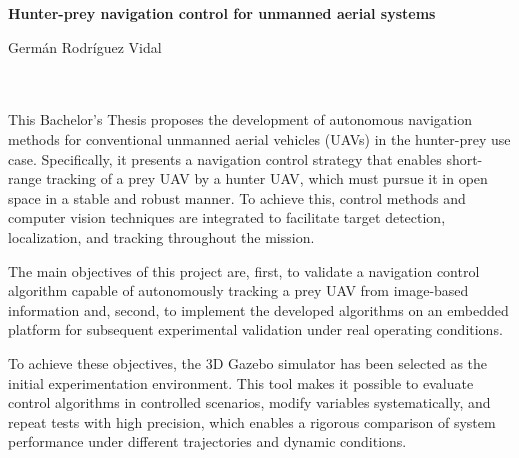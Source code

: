 \endgroup
\clearpage




\begin{center}
{\large\bfseries Hunter-prey navigation control for unmanned aerial systems}\\
\end{center}
\begin{center}
Germán Rodríguez Vidal\\
\end{center}

\\

\vspace{0.7cm}
\begingroup\setlength{\parindent}{0pt}
\\

This Bachelor's Thesis proposes the development of autonomous navigation methods for conventional unmanned aerial vehicles (UAVs) in the hunter-prey use case. Specifically, it presents a navigation control strategy that enables short-range tracking of a prey UAV by a hunter UAV, which must pursue it in open space in a stable and robust manner. To achieve this, control methods and computer vision techniques are integrated to facilitate target detection, localization, and tracking throughout the mission.

\vspace{0.3cm}

The main objectives of this project are, first, to validate a navigation control algorithm capable of autonomously tracking a prey UAV from image-based information and, second, to implement the developed algorithms on an embedded platform for subsequent experimental validation under real operating conditions.

\vspace{0.3cm}

To achieve these objectives, the 3D Gazebo simulator has been selected as the initial experimentation environment. This tool makes it possible to evaluate control algorithms in controlled scenarios, modify variables systematically, and repeat tests with high precision, which enables a rigorous comparison of system performance under different trajectories and dynamic conditions.

\vspace{0.3cm}

